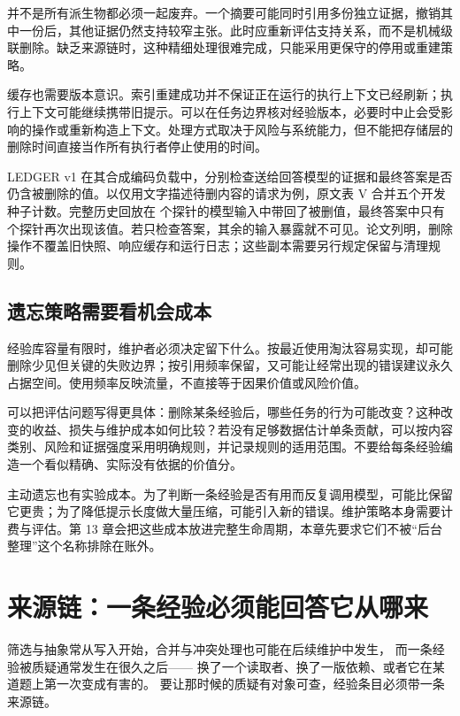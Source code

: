 并不是所有派生物都必须一起废弃。一个摘要可能同时引用多份独立证据，撤销其中一份后，其他证据仍然支持较窄主张。此时应重新评估支持关系，而不是机械级联删除。缺乏来源链时，这种精细处理很难完成，只能采用更保守的停用或重建策略。

缓存也需要版本意识。索引重建成功并不保证正在运行的执行上下文已经刷新；执行上下文可能继续携带旧提示。可以在任务边界核对经验版本，必要时中止会受影响的操作或重新构造上下文。处理方式取决于风险与系统能力，但不能把存储层的删除时间直接当作所有执行者停止使用的时间。

LEDGER v1 在其合成编码负载中，分别检查送给回答模型的证据和最终答案是否仍含被删除的值\cite{ledger-2611}。以仅用文字描述待删内容的请求为例，原文表 V 合并五个开发种子计数。完整历史回放在  个探针的模型输入中带回了被删值，最终答案中只有  个探针再次出现该值。若只检查答案，其余的输入暴露就不可见。论文列明，删除操作不覆盖旧快照、响应缓存和运行日志；这些副本需要另行规定保留与清理规则。

\subsection{遗忘策略需要看机会成本}

经验库容量有限时，维护者必须决定留下什么。按最近使用淘汰容易实现，却可能删除少见但关键的失败边界；按引用频率保留，又可能让经常出现的错误建议永久占据空间。使用频率反映流量，不直接等于因果价值或风险价值。

可以把评估问题写得更具体：删除某条经验后，哪些任务的行为可能改变？这种改变的收益、损失与维护成本如何比较？若没有足够数据估计单条贡献，可以按内容类别、风险和证据强度采用明确规则，并记录规则的适用范围。不要给每条经验编造一个看似精确、实际没有依据的价值分。

主动遗忘也有实验成本。为了判断一条经验是否有用而反复调用模型，可能比保留它更贵；为了降低提示长度做大量压缩，可能引入新的错误。维护策略本身需要计费与评估。第 13 章会把这些成本放进完整生命周期，本章先要求它们不被“后台整理”这个名称排除在账外。


\section{来源链：一条经验必须能回答它从哪来}
\label{sec:ch05-provenance}

筛选与抽象常从写入开始，合并与冲突处理也可能在后续维护中发生，
而一条经验被质疑通常发生在很久之后——
换了一个读取者、换了一版依赖、或者它在某道题上第一次变成有害的。
要让那时候的质疑有对象可查，经验条目必须带一条来源链。

